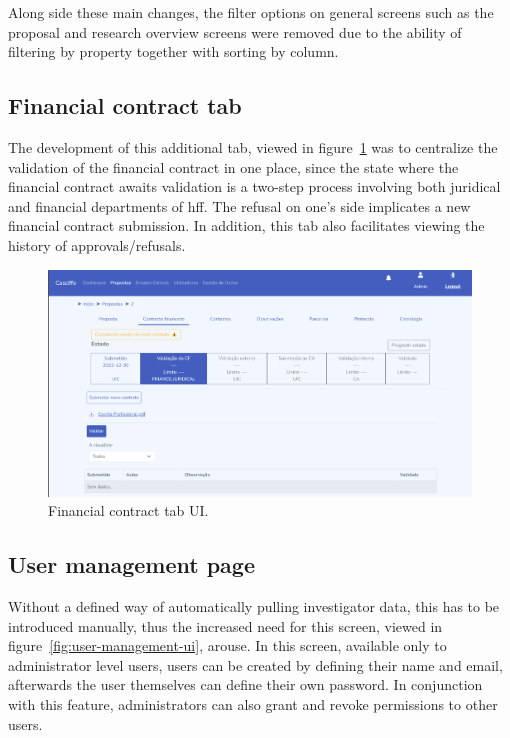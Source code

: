 Along side these main changes, the filter options on general screens such as the proposal and research overview screens were removed due to the ability of filtering by property together with sorting by column.

\subsection{Financial contract tab}

The development of this additional tab, viewed in figure~\ref{fig:cf-tab-ui} was to centralize the validation of the financial contract in one place, since the state where the financial contract awaits validation is a two-step process involving both juridical and financial departments of \acrshort{hff}. The refusal on one's side implicates a new financial contract submission. In addition, this tab also facilitates viewing the history of approvals/refusals.

\begin{figure}[H]
    \centering
    \includegraphics[scale=0.4]{Chapters/img/ui/proposal-cf-tab.png}
    \caption{Financial contract tab UI.}
    \label{fig:cf-tab-ui}
\end{figure}

\subsection{User management page}
Without a defined way of automatically pulling investigator data, this has to be introduced manually, thus the increased need for this screen, viewed in figure~\ref{fig:user-management-ui}, arouse. In this screen, available only to administrator level users, users can be created by defining their name and email, afterwards the user themselves can define their own password. In conjunction with this feature, administrators can also grant and revoke permissions to other users.


